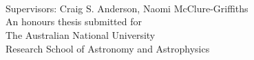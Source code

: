 
\begin{titlepage}
  \begin{center}
    \makeatletter
    {\Huge\textbf{\@title}} \\[.4cm]
    {\Huge\textbf{\thesisqualifier}} \\[.4cm]
    {\huge\textbf{\@author}} \\ [.4cm]
    {\large Supervisors: Craig S. Anderson, Naomi McClure-Griffiths} \\[7cm]
    \makeatother
    {\large An honours thesis submitted for \\
    The Australian National University \\
    Research School of Astronomy and Astrophysics}\\[2cm]
    {\LARGE \thismonth}
  \end{center}
\end{titlepage}
